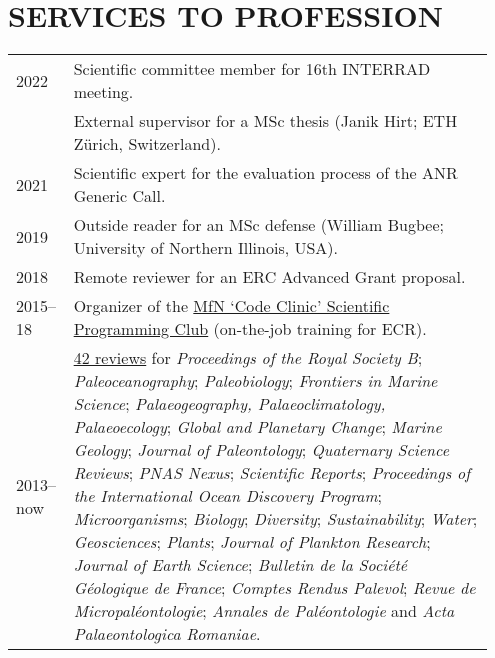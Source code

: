 \documentclass[11pt, a4paper]{article}
\begin{document}
\section{SERVICES TO PROFESSION}
\begin{longtable}{@{}p{0.1\linewidth} P{0.85\linewidth}@{}}
2022 & Scientific committee member for 16th INTERRAD meeting.\\
     & External supervisor for a MSc thesis (Janik Hirt; ETH Zürich, Switzerland).\\
2021 & Scientific expert for the evaluation process of the ANR Generic Call.\\
2019 & Outside reader for an MSc defense (William Bugbee; University of Northern Illinois, USA).\\
2018 & Remote reviewer for an ERC Advanced Grant proposal.\\
2015--18 & Organizer of the \href{https://github.com/plannapus/MfN-Code-Clinic}{MfN `Code Clinic' Scientific Programming Club} (on-the-job training for ECR). \\
2013--now  & \href{https://www.webofscience.com/wos/author/record/540612}{42 reviews} for \textit{Proceedings of the Royal Society B}; \textit{Paleoceanography}; \textit{Paleobiology}; \textit{Frontiers in Marine Science}; \textit{Palaeo\-geography, Palaeo\-climatology, Palaeo\-ecology}; \textit{Global and Planetary Change}; \textit{Marine Geology}; \textit{Journal of Paleontology}; \textit{Quaternary Science Reviews}; \textit{PNAS Nexus}; \textit{Scientific Reports}; \textit{Proceedings of the International Ocean Discovery Program}; \textit{Microorganisms}; \textit{Biology}; \textit{Diversity}; \textit{Sustainability}; \textit{Water}; \textit{Geosciences}; \textit{Plants}; \textit{Journal of Plankton Research}; \textit{Journal of Earth Science}; \textit{Bulletin de la Soci\'{e}t\'{e} G\'{e}ologique de France}; \textit{Comptes Rendus Palevol}; \textit{Revue de Micropal\'{e}ontologie}; \textit{Annales de Pal\'{e}ontologie} and \textit{Acta Palaeontologica Romaniae}. \\
\end{longtable}
\end{document}
